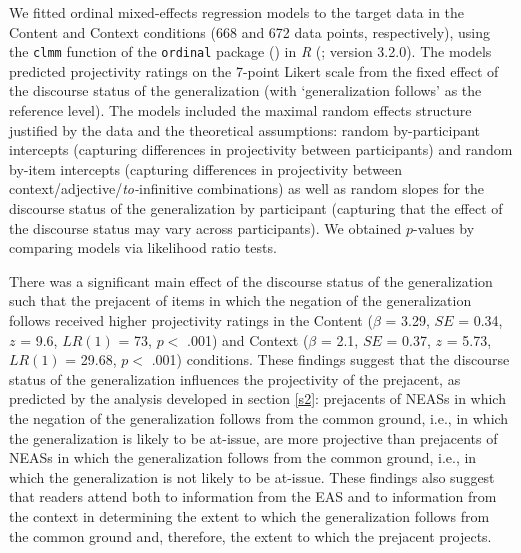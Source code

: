 \documentclass[11pt,fleqn]{article}
\newcommand{\6}{\mbox{$[\hspace*{-.6mm}[$}}
\newcommand{\9}{\mbox{$]\hspace*{-.6mm}]$}}
\begin{document}
We fitted ordinal mixed-effects regression models to the target data in the Content and Context conditions (668 and 672 data points, respectively), using the {\tt clmm} function of the {\tt ordinal} package (\citealt{Christensen2013}) in {\em R} (\citealt{r}; version 3.2.0). The models predicted projectivity ratings on the 7-point Likert scale from the fixed effect of the discourse status of the generalization (with `generalization follows' as the reference level). The models included the maximal random effects structure justified by the data and the theoretical assumptions: random by-participant intercepts (capturing differences in projectivity between participants) and random by-item intercepts (capturing differences in projectivity between context/adjective/{\em to-}infinitive combinations) as well as random slopes for the discourse status of the generalization by participant  (capturing that the effect of the discourse status may vary across participants). We obtained $p$-values by comparing models via likelihood ratio tests.

There was a significant main effect of the discourse status of the generalization such that the prejacent of items in which the negation of the generalization follows received higher projectivity ratings in the Content ($\beta$ = 3.29, $SE$ = 0.34, $z$ = 9.6, $LR(1)$ = 73, $p <$ .001) and Context ($\beta$ = 2.1, $SE$ = 0.37, $z$ = 5.73, $LR(1)$ = 29.68, $p <$ .001) conditions. These findings suggest that the discourse status of the generalization influences the projectivity of the prejacent, as predicted by the analysis developed in section \ref{s2}: prejacents of NEASs in which the negation of the generalization follows from the common ground, i.e., in which the generalization is likely to be at-issue, are more projective than prejacents of NEASs in which the generalization follows from the common ground, i.e., in which the generalization is not likely to be at-issue. These findings also suggest that readers attend both to information from the EAS and to information from the context in determining the extent to which the generalization follows from the common ground and, therefore, the extent to which the prejacent projects.

%
%
%
%
\end{document}
